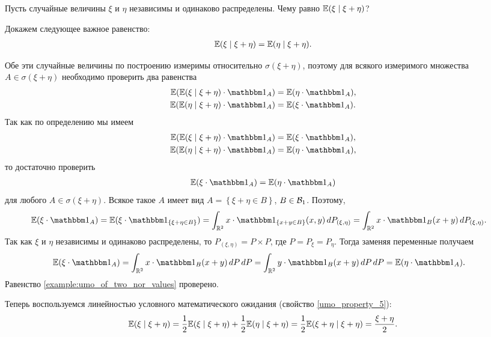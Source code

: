 \documentclass[../main.tex]{subfiles}
\begin{document}
\begin{exmpl}
 Пусть случайные величины $ \xi $ и $ \eta $ независимы и одинаково распределены. Чему равно $ \mathbb E(\xi \mid \xi + \eta) $?

 Докажем следующее важное равенство:
 \begin{align}
  \label{example:umo_of_two_nor_values}
  \mathbb E(\xi\mid\xi+\eta)=\mathbb E(\eta\mid\xi+\eta).
 \end{align}

 Обе эти случайные величины по построению измеримы относительно $ \sigma(\xi+\eta) $, поэтому для всякого измеримого множества $ A \in \sigma(\xi + \eta) $ необходимо проверить два равенства
 \begin{align*}
  \E(\E(\xi \mid \xi + \eta) \cdot \Ind_A) &= \E(\eta \cdot \Ind_A), \\
  \E(\E(\eta \mid \xi + \eta) \cdot \Ind_A) &= \E(\xi \cdot \Ind_A).
 \end{align*} Так как по определению мы имеем
 \begin{align*}
  \E(\E(\xi \mid \xi + \eta) \cdot \Ind_A) &= \E(\xi \cdot \Ind_A), \\
  \E(\E(\eta \mid \xi + \eta) \cdot \Ind_A) &= \E(\eta \cdot \Ind_A),
 \end{align*} то достаточно проверить
 \begin{align*}
  \E(\xi \cdot \Ind_A) = \E(\eta \cdot \Ind_A)
 \end{align*} для любого $ A \in \sigma(\xi + \eta) $. Всякое такое $ A $ имеет вид $ A = \left\{ \xi + \eta \in B \right\} $, $ B \in \mathcal B_1 $. Поэтому,
 \begin{align*}
  \E(\xi \cdot \Ind_A) &= \E(\xi \cdot \Ind_{\left\{ \xi+\eta \in B \right\}}) = \int_{\R^{2}} x \cdot \Ind_{\left\{ x + y \in B \right\}}(x, y)\,dP_{(\xi,\eta)} = \int_{\R^{2}} x \cdot \Ind_B(x + y)\,dP_{(\xi,\eta)}.
 \end{align*} Так как $ \xi $ и $ \eta $ независимы и одинаково распределены, то $ P_{(\xi,\eta)} = P \times P$, где $ P = P_\xi = P_\eta $. Тогда заменяя переменные получаем
 \begin{align*}
  \E(\xi \cdot \Ind_A) &= \int_{\R^{2}} x \cdot \Ind_B(x + y) \,dP \,dP = \int_{\R^{2}} y \cdot \Ind_B(x + y)  \,dP\,dP = \E(\eta \cdot \Ind_A).
 \end{align*} Равенство \eqref{example:umo_of_two_nor_values} проверено.

 Теперь воспользуемся линейностью условного математического ожидания (свойство \ref{umo_property_5}):
  \begin{align*}
   \mathbb E(\xi \mid\xi+\eta) = \frac{1}{2}\mathbb E(\xi\mid\xi+\eta) + \frac{1}{2}\mathbb E(\eta\mid\xi+\eta) = \frac{1}{2}\mathbb E(\xi + \eta \mid \xi + \eta) = \frac{\xi + \eta}{2}.
  \end{align*}
\end{exmpl}
\end{document}
